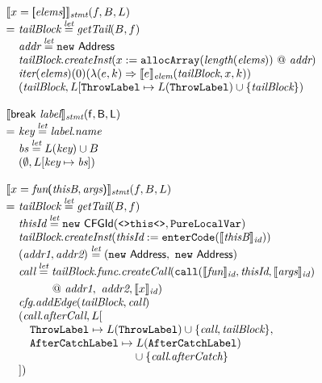 \[
\begin{array}{l@{}l@{~}l}
\lefteqn{\transfun{\irarray{x}{\emph{elems}}}_{\emph{stmt}}(f, B, L)}\\
& = & \emph{tailBlock} \letval \getTail(B, f)\\
& & \emph{addr} \letval \new\ \Address\\
& & \emph{tailBlock}.\emph{createInst}(x :=\TT{allocArray}(\length(\emph{elems})) ~@~ \emph{addr})\\
& & \iter(\emph{elems})(0)(\lambda(e,k) \Rightarrow \transfun{e}_{\emph{elem}}(\emph{tailBlock}, x, k))\\
& & (\emph{tailBlock}, L[\ThrowLabel \mapsto L(\ThrowLabel) \cup \{ \emph{tailBlock} \})\\
& & \\

\lefteqn{\transfun{\sf{break}\ \emph{label}}_{\emph{stmt}}(f, B, L)}\\
& = & \emph{key} \letval \emph{label}.\emph{name}\\
& & \emph{bs} \letval L(\emph{key}) \cup B\\
& & (\emptyset, L[\emph{key} \mapsto \emph{bs}])\\
& & \\


\lefteqn{\transfun{\ircfgcall{x}{\emph{fun}}{\emph{thisB}, \emph{args}}}_{\emph{stmt}}(f, B, L)}\\
& = & \emph{tailBlock} \letval \getTail(B, f)\\
& & \emph{thisId} \letval \new\ \CFGId(\TT{<>this<>}, \TT{PureLocalVar})\\
& & \emph{tailBlock}.\emph{createInst}(\emph{thisId} := \TT{enterCode}(\transfun{\emph{thisB}}_{\emph{id}}))\\
& & (\emph{addr1}, \emph{addr2}) \letval (\new\ \Address,\ \new\ \Address)\\
& & \emph{call} \letval \emph{tailBlock}.\emph{func}.\emph{createCall}(\TT{call}(\transfun{\emph{fun}}_{\emph{id}}, \emph{thisId}, \transfun{\emph{args}}_{\emph{id}})\\
&& \phantom{\emph{call} \letval }
 ~@~ \emph{addr1},\ \emph{addr2}, \transfun{x}_{\emph{id}})\\
& & \emph{cfg}.\emph{addEdge}(\emph{tailBlock}, \emph{call})\\
& & (\emph{call}.\emph{afterCall}, L[\\
& & \quad \ThrowLabel \mapsto L(\ThrowLabel) \cup \{ \emph{call}, \emph{tailBlock} \},\\
& & \quad \AfterCatchLabel \mapsto L(\AfterCatchLabel)\\
& & \quad \phantom{\AfterCatchLabel \mapsto} \cup \{ \emph{call}.\emph{afterCatch} \}\\
& & ])\\


\end{array}\]
